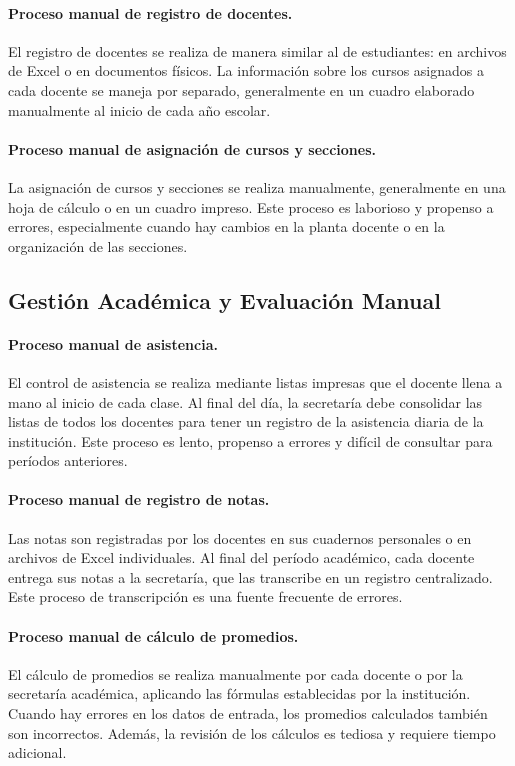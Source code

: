 \documentclass[12pt,a4paper,oneside]{report}
\begin{document}
\paragraph{Proceso manual de registro de docentes.} El registro de docentes se realiza de manera similar al de estudiantes: en archivos de Excel o en documentos físicos. La información sobre los cursos asignados a cada docente se maneja por separado, generalmente en un cuadro elaborado manualmente al inicio de cada año escolar.

\paragraph{Proceso manual de asignación de cursos y secciones.} La asignación de cursos y secciones se realiza manualmente, generalmente en una hoja de cálculo o en un cuadro impreso. Este proceso es laborioso y propenso a errores, especialmente cuando hay cambios en la planta docente o en la organización de las secciones.

\subsection{Gestión Académica y Evaluación Manual}

\paragraph{Proceso manual de asistencia.} El control de asistencia se realiza mediante listas impresas que el docente llena a mano al inicio de cada clase. Al final del día, la secretaría debe consolidar las listas de todos los docentes para tener un registro de la asistencia diaria de la institución. Este proceso es lento, propenso a errores y difícil de consultar para períodos anteriores.

\paragraph{Proceso manual de registro de notas.} Las notas son registradas por los docentes en sus cuadernos personales o en archivos de Excel individuales. Al final del período académico, cada docente entrega sus notas a la secretaría, que las transcribe en un registro centralizado. Este proceso de transcripción es una fuente frecuente de errores.

\paragraph{Proceso manual de cálculo de promedios.} El cálculo de promedios se realiza manualmente por cada docente o por la secretaría académica, aplicando las fórmulas establecidas por la institución. Cuando hay errores en los datos de entrada, los promedios calculados también son incorrectos. Además, la revisión de los cálculos es tediosa y requiere tiempo adicional.
\end{document}
